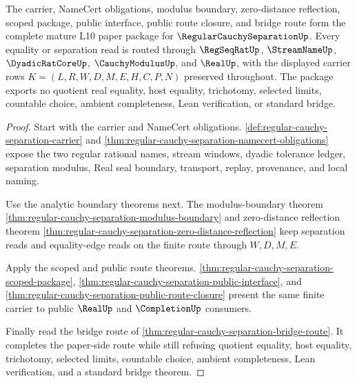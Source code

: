 \begin{theorem}
\label{thm:regular-cauchy-separation-mature-package}
The carrier, NameCert obligations, modulus boundary, zero-distance reflection, scoped package, public interface, public route closure, and bridge route form the complete mature L10 paper package for $\RegularCauchySeparationUp$. Every equality or separation read is routed through $\RegSeqRatUp$, $\StreamNameUp$, $\DyadicRatCoreUp$, $\CauchyModulusUp$, and $\RealUp$, with the displayed carrier rows $K=(L,R,W,D,M,E,H,C,P,N)$ preserved throughout. The package exports no quotient real equality, host equality, trichotomy, selected limits, countable choice, ambient completeness, Lean verification, or standard bridge.
\end{theorem}
\begin{proof}
Start with the carrier and NameCert obligations. \autoref{def:regular-cauchy-separation-carrier} and \autoref{thm:regular-cauchy-separation-namecert-obligations} expose the two regular rational names, stream windows, dyadic tolerance ledger, separation modulus, Real seal boundary, transport, replay, provenance, and local naming.

Use the analytic boundary theorems next. The modulus-boundary theorem \autoref{thm:regular-cauchy-separation-modulus-boundary} and zero-distance reflection theorem \autoref{thm:regular-cauchy-separation-zero-distance-reflection} keep separation reads and equality-edge reads on the finite route through $W,D,M,E$.

Apply the scoped and public route theorems. \autoref{thm:regular-cauchy-separation-scoped-package}, \autoref{thm:regular-cauchy-separation-public-interface}, and \autoref{thm:regular-cauchy-separation-public-route-closure} present the same finite carrier to public $\RealUp$ and $\CompletionUp$ consumers.

Finally read the bridge route of \autoref{thm:regular-cauchy-separation-bridge-route}. It completes the paper-side route while still refusing quotient equality, host equality, trichotomy, selected limits, countable choice, ambient completeness, Lean verification, and a standard bridge theorem.
\end{proof}

